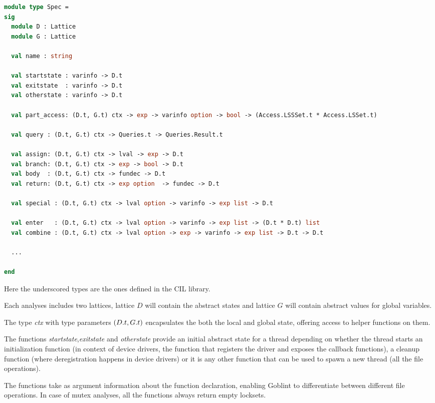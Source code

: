 \documentclass[..thesis.tex]{subfiles}
\begin{document}
\begin{lstlisting}[language=Caml,style=caml]
module type Spec =
sig
  module D : Lattice
  module G : Lattice

  val name : string

  val startstate : varinfo -> D.t
  val exitstate  : varinfo -> D.t
  val otherstate : varinfo -> D.t

  val part_access: (D.t, G.t) ctx -> exp -> varinfo option -> bool -> (Access.LSSSet.t * Access.LSSet.t)

  val query : (D.t, G.t) ctx -> Queries.t -> Queries.Result.t

  val assign: (D.t, G.t) ctx -> lval -> exp -> D.t
  val branch: (D.t, G.t) ctx -> exp -> bool -> D.t
  val body  : (D.t, G.t) ctx -> fundec -> D.t
  val return: (D.t, G.t) ctx -> exp option  -> fundec -> D.t

  val special : (D.t, G.t) ctx -> lval option -> varinfo -> exp list -> D.t

  val enter   : (D.t, G.t) ctx -> lval option -> varinfo -> exp list -> (D.t * D.t) list
  val combine : (D.t, G.t) ctx -> lval option -> exp -> varinfo -> exp list -> D.t -> D.t

  ...

end
\end{lstlisting}

Here the underscored types are the ones defined in the CIL library.

Each analyses includes two lattices, lattice $D$ will contain the abstract states and lattice $G$ will contain abstract values for global variables.

The type \textit{ctx} with type parameters $\left( D.t, G.t \right)$ encapsulates the both the local and global state, offering access to helper functions on them. 

The functions \textit{startstate},\textit{exitstate} and \textit{otherstate} provide an initial abstract state for a thread depending on whether the thread starts an
initialization function (in context of device drivers, the function that registers the driver and exposes the callback functions),
a cleanup function (where deregistration happens in device drivers) or it is any other function that can be used to spawn a new thread (all the file operations).

The functions take as argument information about the function declaration, enabling Goblint to differentiate between different file operations.
In case of mutex analyses, all the functions always return empty locksets.
\end{document}
